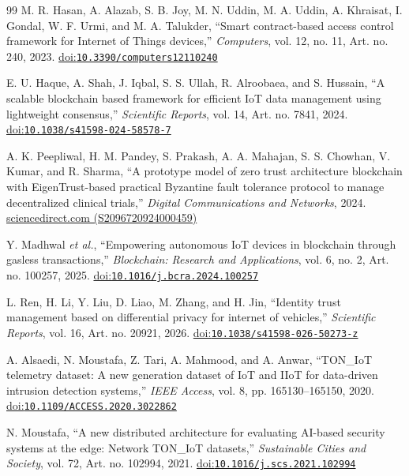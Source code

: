 \begin{thebibliography}{99}
M. R. Hasan, A. Alazab, S. B. Joy, M. N. Uddin, M. A. Uddin, A. Khraisat, I. Gondal, W. F. Urmi, and M. A. Talukder, ``Smart contract-based access control framework for Internet of Things devices,'' \emph{Computers}, vol. 12, no. 11, Art. no. 240, 2023. \href{https://doi.org/10.3390/computers12110240}{doi:\nolinkurl{10.3390/computers12110240}}

E. U. Haque, A. Shah, J. Iqbal, S. S. Ullah, R. Alroobaea, and S. Hussain, ``A scalable blockchain based framework for efficient IoT data management using lightweight consensus,'' \emph{Scientific Reports}, vol. 14, Art. no. 7841, 2024. \href{https://doi.org/10.1038/s41598-024-58578-7}{doi:\nolinkurl{10.1038/s41598-024-58578-7}}

A. K. Peepliwal, H. M. Pandey, S. Prakash, A. A. Mahajan, S. S. Chowhan, V. Kumar, and R. Sharma, ``A prototype model of zero trust architecture blockchain with EigenTrust-based practical Byzantine fault tolerance protocol to manage decentralized clinical trials,'' \emph{Digital Communications and Networks}, 2024. \href{https://www.sciencedirect.com/science/article/pii/S2096720924000459}{sciencedirect.com (S2096720924000459)}

Y. Madhwal \emph{et al.}, ``Empowering autonomous IoT devices in blockchain through gasless transactions,'' \emph{Blockchain: Research and Applications}, vol. 6, no. 2, Art. no. 100257, 2025. \href{https://doi.org/10.1016/j.bcra.2024.100257}{doi:\nolinkurl{10.1016/j.bcra.2024.100257}}

L. Ren, H. Li, Y. Liu, D. Liao, M. Zhang, and H. Jin, ``Identity trust management based on differential privacy for internet of vehicles,'' \emph{Scientific Reports}, vol. 16, Art. no. 20921, 2026. \href{https://doi.org/10.1038/s41598-026-50273-z}{doi:\nolinkurl{10.1038/s41598-026-50273-z}}

A. Alsaedi, N. Moustafa, Z. Tari, A. Mahmood, and A. Anwar, ``TON\_IoT telemetry dataset: A new generation dataset of IoT and IIoT for data-driven intrusion detection systems,'' \emph{IEEE Access}, vol. 8, pp. 165130--165150, 2020. \href{https://doi.org/10.1109/ACCESS.2020.3022862}{doi:\nolinkurl{10.1109/ACCESS.2020.3022862}}

N. Moustafa, ``A new distributed architecture for evaluating AI-based security systems at the edge: Network TON\_IoT datasets,'' \emph{Sustainable Cities and Society}, vol. 72, Art. no. 102994, 2021. \href{https://doi.org/10.1016/j.scs.2021.102994}{doi:\nolinkurl{10.1016/j.scs.2021.102994}}


\end{thebibliography}
